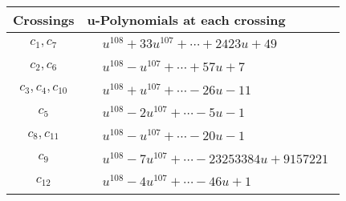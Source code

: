 \documentclass[1p]{elsarticle_modified}
\theoremstyle{definition}
\begin{document}
\begin{tabular}{m{50pt}|m{274pt}}
Crossings & \hspace{64pt}u-Polynomials at each crossing \\
\hline $$\begin{aligned}c_{1},c_{7}\end{aligned}$$&$\begin{aligned}
&u^{108}+33 u^{107}+\cdots+2423 u+49
\end{aligned}$\\
\hline $$\begin{aligned}c_{2},c_{6}\end{aligned}$$&$\begin{aligned}
&u^{108}- u^{107}+\cdots+57 u+7
\end{aligned}$\\
\hline $$\begin{aligned}c_{3},c_{4},c_{10}\end{aligned}$$&$\begin{aligned}
&u^{108}+u^{107}+\cdots-26 u-11
\end{aligned}$\\
\hline $$\begin{aligned}c_{5}\end{aligned}$$&$\begin{aligned}
&u^{108}-2 u^{107}+\cdots-5 u-1
\end{aligned}$\\
\hline $$\begin{aligned}c_{8},c_{11}\end{aligned}$$&$\begin{aligned}
&u^{108}- u^{107}+\cdots-20 u-1
\end{aligned}$\\
\hline $$\begin{aligned}c_{9}\end{aligned}$$&$\begin{aligned}
&u^{108}-7 u^{107}+\cdots-23253384 u+9157221
\end{aligned}$\\
\hline $$\begin{aligned}c_{12}\end{aligned}$$&$\begin{aligned}
&u^{108}-4 u^{107}+\cdots-46 u+1
\end{aligned}$\\
\hline
\end{tabular}\\~\\
\newpage\renewcommand{\arraystretch}{1}
\end{document}
